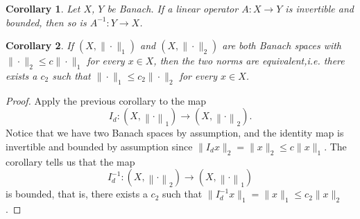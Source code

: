 \documentclass[letterpaper,twoside,11pt]{article}
\theoremstyle{mystyle}
\newtheorem{corollary}{Corollary}[theorem]
\newcommand{\cg}{\color{gray}}
\newcommand{\cbk}{\color{black}}
\begin{document}
\begin{tcolorbox}[colframe=red!75!black]
  \begin{corollary}
    Let $X$, $Y$ be Banach. If a linear operator $A: X\to Y$ is invertible and bounded, then so is $A^{-1}:Y\to X$. 
  \end{corollary}
\end{tcolorbox}

\begin{tcolorbox}[colframe=red!75!black]
  \begin{corollary}
    If $(X, \|\cdot\|_1)$ and $(X, \|\cdot\|_2)$ are both Banach spaces with $\|\cdot \|_2 \leq c \|\cdot\|_1$ for every $x\in X$, then the two norms are equivalent,\cg i.e. there exists a $c_2$ such that $\|\cdot \|_1 \leq c_2 \|\cdot \|_2$ for every $x\in X$. 
  \end{corollary}
\end{tcolorbox}
\begin{proof}
  Apply the previous corollary to the map 
  \[{I_d}:\left( {X,{{\left\|  \cdot  \right\|}_1}} \right) \to \left( {X,{{\left\|  \cdot  \right\|}_2}} \right).\]
  \cg Notice that we have two Banach spaces by assumption, and the identity map is invertible and bounded by assumption since $\|I_d x \|_2 = \|x\|_2 \leq c \|x\|_1.$ The corollary tells us that the map \[I_d^{ - 1}:\left( {X,{{\left\|  \cdot  \right\|}_2}} \right) \to \left( {X,{{\left\|  \cdot  \right\|}_1}} \right)\] is bounded, that is, there exists a $c_2$ such that $\|I_d^{-1}x\|_1 = \|x\|_1\leq c_2 \|x\|_2 $.\cbk
\end{proof}
\end{document}
